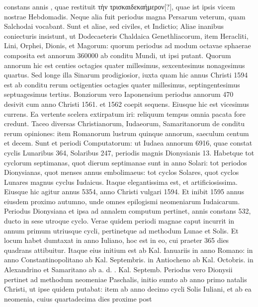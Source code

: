 constans annis , quae restituit
 \textgreek{τὴν τρισκαιδεκαήμερον[?]}, quae ist ipsis
vicem nostrae Hebdomadis.
Neque alia fuit periodus magna Persarum
veterum, quam Salchodai vocabant.
Sunt et aliae, sed civiles, et Indictio;
Aliae inanibus coniecturis insistunt, ut Dodecaeteris Chaldaica
Genethliacorum, item Heracliti, Lini, Orphei, Dionis, et Magorum:
quorum periodus ad modum octavae sphaerae composita est annorum
360000 ab conditu Mundi, ut ipsi putant.
Quorum annorum hic est
centies octagies quater millesimus, sexcentesimus nonagesimus quartus.
Sed longe illa Sinarum prodigiosior, iuxta quam hic annus Christi
1594 est ab conditu rerum octigenties octagies quater millesimus,
septingentesimus septuagesimus tertius.
Bonziorum vero Iaponensium
periodus annorum 470 desivit cum anno Christi 1561. et 1562
coepit sequens.
Eiusque hic est vicesimus currens.
Ea vertente scelera
extirpatum iri: reliquum tempus omnia pacata fore credunt.
Taceo
diversas Christianorum, Iudaeorum, Samaritanorum de conditu rerum
opiniones: item Romanorum lustrum quinque annorum, saeculum
centum et decem.
%
Sunt et periodi Computatorum: ut Iudaea
annorum 6916, quae constat cyclis Lunaribus 364, Solaribus 247, periodis
magnis Dionysianis 13.
Habetque tot cyclorum septimanas,
quot dierum septimanae sunt in anno Solari: tot periodos Dionysianas,
quot menses annus embolimaeus: tot cyclos Solares, quot cyclos
Lunares magnus cyclus Iudaicus.
Itaque elegantissima est, et artificiosissima.
Eiusque hic agitur annus 5354, anno Christi vulgari 1594.
Et inibit 1595 annus eiusdem proximo autumno, unde omnes epilogismi
neomeniarum Iudaicarum.
Periodus Dionysiana et ipsa ad
annalem computum pertinet, annis constans 532, ducto in sese utroque
cyclo.
Verae quidem periodi magnae caput incurrit in annum
primum utriusque cycli, pertinetque ad methodum Lunae et Solis.
Et
locum habet dumtaxat in anno Iuliano, hoc est in eo, cui praeter 365
dies quadrans attibuitur.
Itaque eius initium est ab Kal. Ianuariis in
anno Romano: in anno Constantinopolitano ab Kal. Septembris. in
Antiocheno ab Kal. Octobris. in Alexandrino et Samaritano ab a. d.
. Kal. Septemb.
Periodus vero Dionysii pertinet ad methodum
neomeniae Paschalis, initio sumto ab anno primo natalis Christi, ut
ipse quidem putabat: item ab anno decimo cycli Solis Iuliani, et ab
ea neomenia, cuius quartadecima dies proxime post
